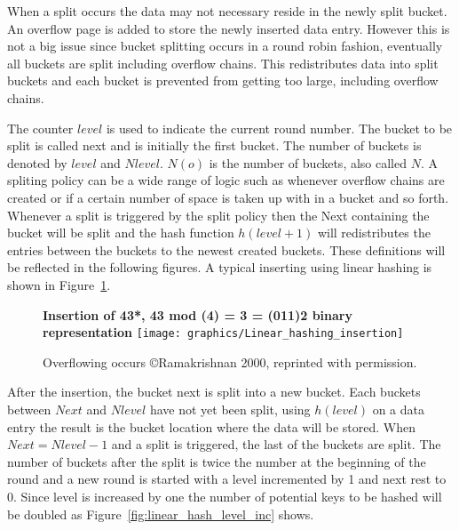 \documentclass[letterpaper, 12pt]{article}
\begin{document}
When a split occurs the data may not necessary reside in the newly split bucket. An overflow page is
added to store the newly inserted data entry. However this is not a big issue since bucket splitting
occurs in a round robin fashion, eventually all buckets are split including overflow chains.
This redistributes data into split buckets and each bucket is prevented from getting too large,
including overflow chains.
\par\vspace{\baselineskip}

The counter $level$ is used to indicate the current round number. The bucket to be split is called
next and is initially the first bucket. The number of buckets is denoted by $level$ and $Nlevel$.
$N(o)$ is the number of buckets, also called $N$. A spliting policy can be a wide range of logic
such as whenever overflow chains are created or if a certain number of space is taken up with
in a bucket and so forth. Whenever a split is triggered by the split policy then the Next containing
the bucket will be split and the hash function $h(level+1)$ will redistributes the entries
between the buckets to the newest created buckets. These definitions will be reflected in the following
figures. A typical inserting using linear hashing is shown in Figure~\ref{fig:linear_hash_insert}.
\par\vspace{\baselineskip}

\begin{figure}[H]
  \centering
  \textbf{Insertion of 43*, 43 mod (4) = 3 = (011)2 binary representation}
  \texttt{[image: graphics/Linear\_hashing\_insertion]}
  \caption{Overflowing occurs \copyright Ramakrishnan 2000, reprinted with \newline permission.\cite{ramakrishnan2000database}}
  \label{fig:linear_hash_insert}
\end{figure}

After the insertion, the bucket next is split into a new bucket. Each buckets between $Next$ and $Nlevel$ have not yet been split,
using $h(level)$ on a data entry the result is the bucket location where the data will be stored.
When $Next = Nlevel - 1$ and a split is triggered, the last of the buckets are split. The 
number of buckets after the split is twice the number at the beginning of the round and a new round is 
started with a level incremented by 1 and next rest to 0. Since level is increased by one the number 
of potential keys to be hashed will be doubled as Figure~\ref{fig:linear_hash_level_inc} shows.
\par\vspace{\baselineskip}
\end{document}
